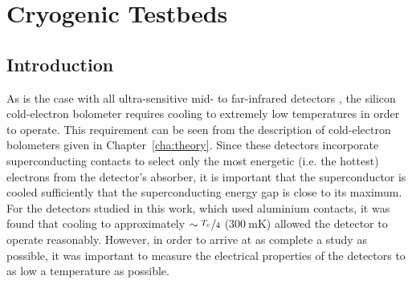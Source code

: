 \chapter{Cryogenic Testbeds}
\label{cha:testbeds}
%
\section{Introduction}\label{sec:testbeds_Introduction}
As is the case with all ultra-sensitive mid- to far-infrared detectors \parencite[as described by][]{Richards1994}, the silicon cold-electron bolometer requires cooling to extremely low temperatures in order to operate. This requirement can be seen from the description of cold-electron bolometers given in Chapter~\ref{cha:theory}. Since these detectors incorporate superconducting contacts to select only the most energetic (i.e. the hottest) electrons from the detector's absorber, it is important that the superconductor is cooled sufficiently that the superconducting energy gap is close to its maximum. For the detectors studied in this work, which used aluminium contacts, it was found  that cooling to approximately $\sim \nicefrac{T_{c}\,}{4}$ ($300~\mathrm{mK}$) allowed the detector to operate reasonably. However, in order to arrive at as complete a study as possible, it was important to measure the electrical properties of the detectors to as low a temperature as possible.
\par 
